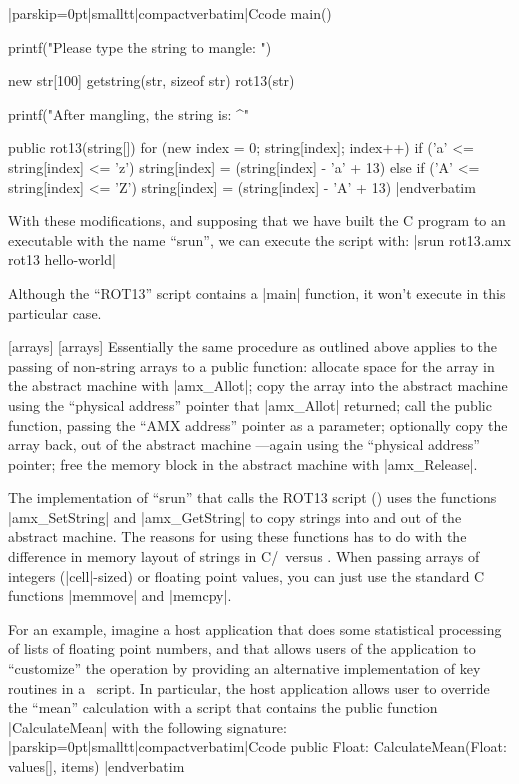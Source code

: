  
\listingx\verbatim|parskip=0pt|smalltt|compactverbatim|Ccode
main()
    {
    printf("Please type the string to mangle: ")

    new str[100]
    getstring(str, sizeof str)
    rot13(str)

    printf("After mangling, the string is: ^"%
    }

public rot13(string[])
    {
    for (new index = 0; string[index]; index++)
        if ('a' <= string[index] <= 'z')
            string[index] = (string[index] - 'a' + 13) %
        else if ('A' <= string[index] <= 'Z')
            string[index] = (string[index] - 'A' + 13) %
    }
|endverbatim\endlistingx

With these modifications, and supposing that we have built the C program to an
executable with the name ``srun'', we can execute the script with:
\tabto 35pt |srun rot13.amx rot13 hello-world|

Although the ``ROT13'' script contains a |main| function, it won't execute in
this particular case.

[arrays] [arrays]
Essentially the same procedure as outlined above applies to the passing of
non-string arrays to a public function:
\beginlist{1em}\compactlist
\list{\lnumber}
  allocate space for the array in the abstract machine with |amx_Allot|;
\list{\lnumber}
  copy the array into the abstract machine using the ``physical address'' pointer
  that |amx_Allot| returned;
\list{\lnumber}
  call the public function, passing the ``AMX address'' pointer as a parameter;
\list{\lnumber}
  optionally copy the array back, out of the abstract machine ---again using the
  ``physical address'' pointer;
\list{\lnumber}
  free the memory block in the abstract machine with |amx_Release|.
\endlist

The implementation of ``srun'' that calls the ROT13 script ()
uses the functions |amx_SetString| and |amx_GetString| to copy strings into and
out of the abstract machine. The reasons for using these functions has to do with
the difference in memory layout of strings in C/\Cpp\ versus \Small. When passing
arrays of integers (|cell|-sized) or floating point values, you can just use the
standard C functions |memmove| and |memcpy|.  

For an example, imagine a host application that does some statistical processing
of lists of floating point numbers, and that allows users of the application to
``customize'' the operation by providing an alternative implementation of key
routines in a \Small\ script. In particular, the host application allows user to
override the ``mean'' calculation with a script that contains the public function
|CalculateMean| with the following signature:
\listingx\verbatim|parskip=0pt|smalltt|compactverbatim|Ccode
public Float: CalculateMean(Float: values[], items)
|endverbatim\endlistingx

